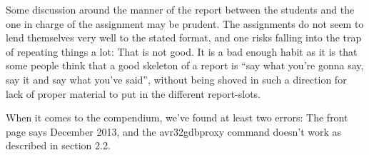 Some discussion around the manner of the report between the students and the one in charge of the assignment may be prudent. The assignments do not seem to lend themselves very well to the stated format, and one risks falling into the trap of repeating things a lot: That is not good. It is a bad enough habit as it is that some people think that a good skeleton of a report is “say what you’re gonna say, say it and say what you’ve said”, without being shoved in such a direction for lack of proper material to put in the different report-slots.

When it comes to the compendium, we’ve found at least two errors: The front page says December 2013, and the avr32gdbproxy command doesn’t work as described in section 2.2.
